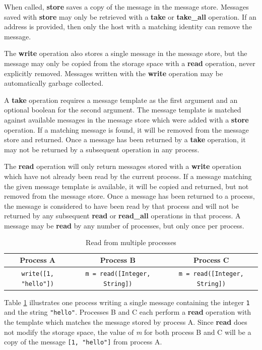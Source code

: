\documentclass{llncs}
\begin{document}
When called, \textbf{store} saves a copy of the message in the message store. Messages saved with \textbf{store} may only be retrieved with a \textbf{take} or \textbf{take\_all} operation. If an address is provided, then only the host with a matching identity can remove the message.

The \textbf{write} operation also stores a single message in the message store, but the message may only be copied from the storage space with a \textbf{read} operation, never explicitly removed. Messages written with the \textbf{write} operation may be automatically garbage collected.

A \textbf{take} operation requires a message template as the first argument and an optional boolean for the second argument. The message template is matched against available messages in the message store which were added with a \textbf{store} operation. If a matching message is found, it will be removed from the message store and returned. Once a message has been returned by a \textbf{take} operation, it may not be returned by a subsequent operation in any process.

The \textbf{read} operation will only return messages stored with a \textbf{write} operation which have not already been read by the current process. If a message matching the given message template is available, it will be copied and returned, but not removed from the message store. Once a message has been returned to a process, the message is considered to have been read by that process and will not be returned by any subsequent \textbf{read} or \textbf{read\_all} operations in that process. A message may be \textbf{read} by any number of processes, but only once per process.

\begin{table}
\centering
\caption{Read from multiple processes}
\begin{tabular}{|c|c|c|} \hline
\textbf{Process A} & \textbf{Process B} & \textbf{Process C} \\ \hline
\texttt{write([1, "hello"])} & \texttt{m = read([Integer, String])} & \texttt{m = read([Integer, String])} \\ \hline
\end{tabular}
\label{fig:readprocesses}
\end{table}

Table \ref{fig:readprocesses} illustrates one process writing a single message containing the integer \texttt{1} and the string \texttt{"hello"}. Processes B and C each perform a \textbf{read} operation with the template which matches the message stored by process A. Since \textbf{read} does not modify the storage space, the value of \textit{m} for both process B and C will be a copy of the message \texttt{[1, "hello"]} from process A.
\end{document}
